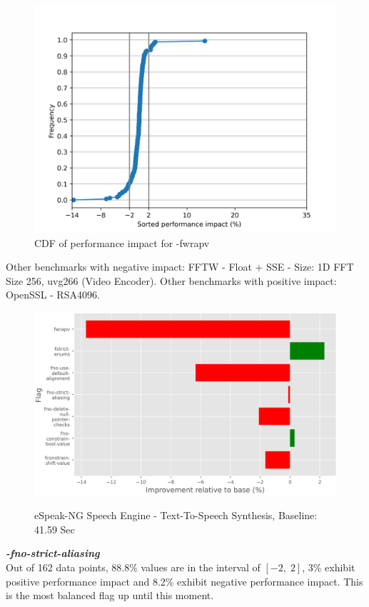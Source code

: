 \documentclass{sciposter}
\begin{document}
\begin{multicols}{3}
\begin{figure}[h!]
\centering
\includegraphics[scale=1.2]{fwrapv}
\caption{CDF of performance impact for -fwrapv}
\end{figure}

Other benchmarks with negative impact: FFTW - Float + SSE - Size: 1D FFT Size
256, uvg266 (Video Encoder). Other benchmarks with positive impact: OpenSSL -
RSA4096.

\begin{figure}[h!]
\centering
\includegraphics[scale=1.2]{espeak} \\
\caption{eSpeak-NG Speech Engine - Text-To-Speech Synthesis, Baseline:
41.59 Sec} 
\label{fig:espeak}
\end{figure}

\textbf{\textit{-fno-strict-aliasing}} \\
Out of 162 data points, 88.8\% values are in the interval of \( [-2,\;2] \), 
3\% exhibit positive performance impact and 8.2\% exhibit negative
performance impact. This is the most balanced flag up until this moment.


\end{multicols}
\end{document}
